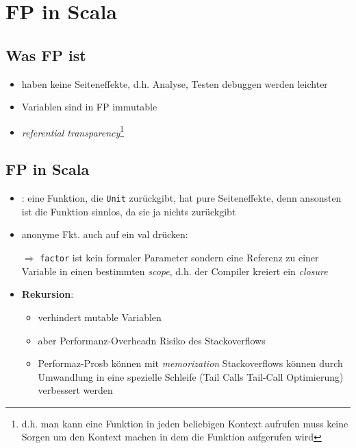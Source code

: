 \section{FP in Scala}


\subsection{Was FP ist}
\begin{itemize}
  \item haben keine Seiteneffekte, d.h. Analyse, Testen \und debuggen
  werden leichter
  \item Variablen sind in FP immutable
  \item \textit{referential transparency}\footnote{d.h. man kann eine
  Funktion in jeden beliebigen Kontext aufrufen \und muss keine Sorgen 
  um den Kontext machen in dem die Funktion aufgerufen wird}
\end{itemize}


\subsection{FP in Scala}
\begin{itemize}
  \item {}: eine Funktion, die \texttt{Unit} zurückgibt,
  hat pure Seiteneffekte, denn ansonsten ist die Funktion sinnlos,
  da sie ja nichts zurückgibt
  
  
  
  \item anonyme Fkt. auch auf ein val drücken:
  
  
  
  $\Rightarrow$ \texttt{factor} ist kein formaler Parameter sondern eine
  Referenz zu einer Variable in einen bestimmten \textit{scope}, d.h. 
  der Compiler kreiert ein \textit{closure}
  \item \textbf{Rekursion}:
  
  \begin{itemize}
    \item verhindert mutable Variablen
    \item aber Performanz-Overheadn \und Risiko des Stackoverflows
    \item Performaz-Prosb können mit \textit{memorization} \und 
    Stackoverflows können durch Umwandlung in eine spezielle 
    Schleife (Tail Calls \und Tail-Call Optimierung) verbessert
    werden
  \end{itemize}
\end{itemize}


